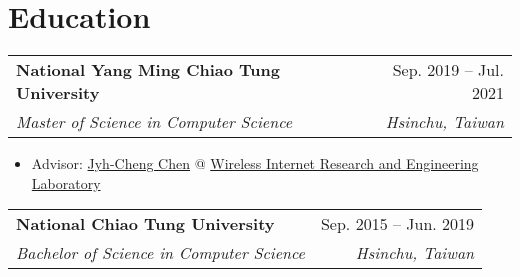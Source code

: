 \documentclass[letterpaper,11pt]{article}
\makeatletter
\newcommand{\resumeItemTwo}[1]{
  \item\small{
    {#1 \vspace{-2pt}}
  }
}
\newcommand{\resumeSubheading}[4]{
  \vspace{1pt}%
    \begin{tabular*}{0.97\textwidth}{l@{\extracolsep{\fill}}r}
      \textbf{#1} & #2 \\
      \textit{\small#3} & \textit{\small #4} \\
    \end{tabular*}\vspace{-5pt}
}
\newcommand{\resumeSubHeadingListStart}{}%
\newcommand{\resumeSubHeadingListEnd}{}%
\newcommand{\resumeItemListStart}{\begin{itemize}}
\newcommand{\resumeItemListEnd}{\end{itemize}\vspace{-5pt}}
\makeatother
\begin{document}
\section{Education}
  \resumeSubHeadingListStart
    \resumeSubheading
      {National Yang Ming Chiao Tung University}{Sep. 2019 -- Jul. 2021}
      {Master of Science in Computer Science}{Hsinchu, Taiwan}
      \resumeItemListStart
        \resumeItemTwo{Advisor: \href{https://people.cs.nctu.edu.tw/~jcc/}{Jyh-Cheng Chen} @ \href{http://wire.cs.nctu.edu.tw/}{Wireless Internet Research and Engineering Laboratory}}
      \resumeItemListEnd
    \resumeSubheading
      {National Chiao Tung University}{Sep. 2015 -- Jun. 2019}
      {Bachelor of Science in Computer Science}{Hsinchu, Taiwan}
  \resumeSubHeadingListEnd
  
\end{document}
